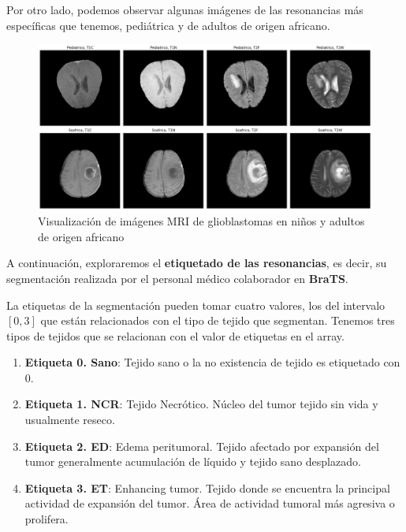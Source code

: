 Por otro lado, podemos observar algunas imágenes de las resonancias más específicas que tenemos, pediátrica y de adultos de origen africano.

\begin{figure}[!h]
	\centering
	\includegraphics[width=1.0\linewidth]{imagenes/imgSSAPEDMRI.png}
	\caption{Visualización de imágenes MRI de glioblastomas en niños y adultos de origen africano}
	\label{fig:visual1}
\end{figure}

\newpage

A continuación, exploraremos el \textbf{etiquetado de las resonancias}, es decir, su segmentación realizada por el personal médico colaborador en \textbf{BraTS}.

La etiquetas de la segmentación pueden tomar cuatro valores, los del intervalo $[0, 3]$ que están relacionados con el tipo de tejido que segmentan. Tenemos tres tipos de tejidos que se relacionan con el valor de etiquetas en el array.

\begin{enumerate}
	\item \textbf{Etiqueta 0. Sano}: Tejido sano o la no existencia de tejido es etiquetado con $0$.
	\item \textbf{Etiqueta 1. NCR}: Tejido Necrótico. Núcleo del tumor tejido sin vida y usualmente reseco.
	\item \textbf{Etiqueta 2. ED}: Edema peritumoral. Tejido afectado por expansión del tumor generalmente acumulación de líquido y tejido sano desplazado. 
	\item \textbf{Etiqueta 3. ET}: Enhancing tumor. Tejido donde se encuentra la principal actividad de expansión del tumor. Área de actividad tumoral más agresiva o prolifera.
\end{enumerate}

